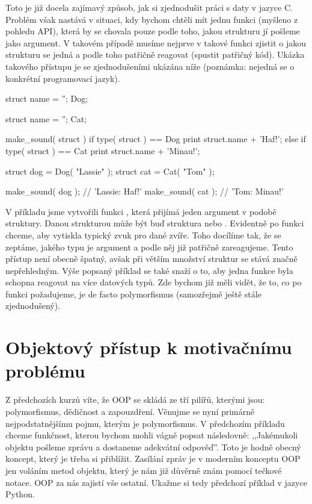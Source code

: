 Toto je již docela zajímavý způsob, jak si zjednodušit práci s daty v jazyce C. Problém však nastává
v situaci, kdy bychom chtěli mít jednu funkci (myšleno z pohledu API), která by se chovala pouze podle
toho, jakou strukturu jí pošleme jako argument. V takovém případě musíme nejprve v takové funkci zjistit
o jakou strukturu se jedná a podle toho patřičně reagovat (spustit patřičný kód). Ukázka takového přístupu
je se zjednodušeními ukázána níže (poznámka: nejedná se o konkrétní programovací jazyk).

\begin{python}
struct {
    name = '';
} Dog;

struct {
    name = '';
} Cat;

make_sound( struct ) {
    if type( struct ) == Dog {
        print struct.name + 'Haf!';
    }
    else if type( struct ) == Cat {
        print struct.name + 'Minau!';
    }
}

struct dog = Dog( "Lassie" );
struct cat = Cat( "Tom" );

make_sound( dog ); // 'Lassie: Haf!'
make_sound( cat ); // 'Tom: Minau!'
\end{python}

V příkladu jsme vytvořili funkci , která přijímá jeden argument v podobě struktury.
Danou strukturou může být buď struktura  nebo . Evidentně po funkci 
chceme, aby vytiskla typický zvuk pro dané zvíře. Toho docílíme tak, že se zeptáme, jakého typu je
argument a podle něj již patřičně zareagujeme. Tento přístup není obecně špatný, avšak při větším množství
struktur se stává značně nepřehledným. Výše popsaný příklad se také snaží o to, aby jedna funkce byla
schopna reagovat na více datových typů. Zde bychom již měli vidět, že to, co po funkci požadujeme, je
de facto polymorfismus (samozřejmě ještě stále zjednodušený).


\section{Objektový přístup k motivačnímu problému}

Z předchozích kurzů víte, že OOP se skládá ze tří pilířů, kterými jsou:
polymorfismus, dědičnost a zapouzdření.
Věnujme se nyní primárně nejpodstatnějšímu pojmu, kterým je polymorfismus. V předchozím příkladu 
chceme funkčnost, kterou bychom mohli vágně popsat následovně: ,,Jakémukoli objektu pošleme zprávu
a dostaneme adekvátní odpověď''. Toto je hodně obecný koncept, který je třeba si přiblížit. Zasílání
zpráv je v moderním konceptu OOP jen voláním metod objektu, který je nám již důvěrně znám pomocí
tečkové notace. OOP za nás zajistí vše ostatní. Ukažme si tedy předchozí příklad v jazyce Python.

